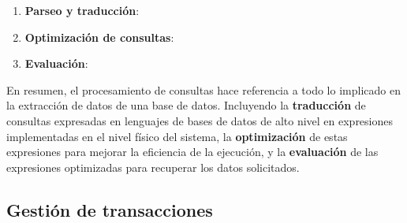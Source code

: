\begin{enumerate}
    \item \textbf{Parseo y traducción}:
    \item \textbf{Optimización de consultas}:
    \item \textbf{Evaluación}:
\end{enumerate}

\begin{tcolorbox}[colback=white,colframe=red,sharp corners]
En resumen, el procesamiento de consultas hace referencia a todo lo implicado en la extracción de datos de una base de datos. Incluyendo la \textbf{traducción} de consultas expresadas en lenguajes de bases de datos de alto nivel en expresiones implementadas en el nivel físico del sistema, la \textbf{optimización} de estas expresiones para mejorar la eficiencia de la ejecución, y la \textbf{evaluación} de las expresiones optimizadas para recuperar los datos solicitados.
\end{tcolorbox}

\subsection{Gestión de transacciones}

